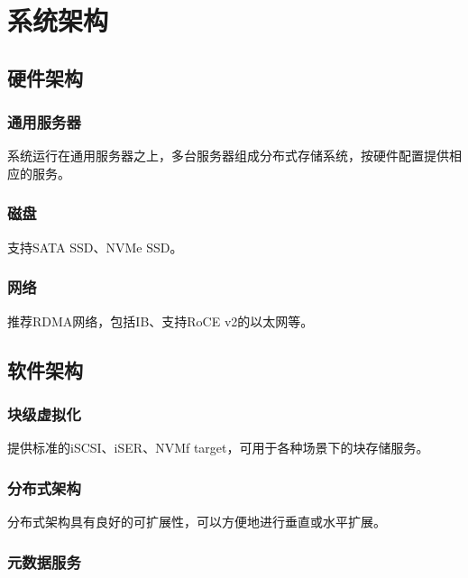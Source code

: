 \chapter{系统架构}

\section{硬件架构}

\subsection{通用服务器}

系统运行在通用服务器之上，多台服务器组成分布式存储系统，按硬件配置提供相应的服务。

\subsection{磁盘}

支持SATA SSD、NVMe SSD。

\subsection{网络}

推荐RDMA网络，包括IB、支持RoCE v2的以太网等。

\section{软件架构}



\subsection{块级虚拟化}

提供标准的iSCSI、iSER、NVMf target，可用于各种场景下的块存储服务。

\subsection{分布式架构}

分布式架构具有良好的可扩展性，可以方便地进行垂直或水平扩展。

\subsection{元数据服务}

